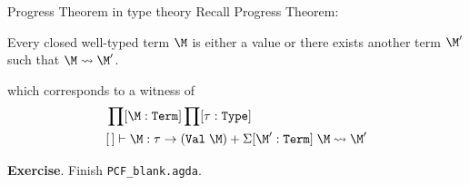 \begin{frame}{Progress Theorem in type theory}
  Recall Progress Theorem:
  \begin{theorem}
    Every closed well-typed \PCF{} term $\M$ is either a value or there exists
    another term $\M'$ such that $\M \leadsto \M'$. 
  \end{theorem} 
  which corresponds to a witness of 
  \begin{align*}
    & \prod[ \M : \texttt{Term}]\prod[ \tau : \texttt{Type} ] \\
    & [\,] \vdash \M : \tau \to (\mathtt{Val}\;\M) +
    \Sigma[ \M' : \mathtt{Term} ]\;
    \M \leadsto \M'
  \end{align*}

  \textbf{Exercise}. Finish \texttt{PCF\_blank.agda}. 
\end{frame}


